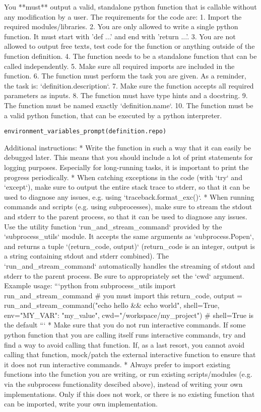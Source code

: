 \begin{tcolorbox}[title={\texttt{Coding Instructions}}]
You **must** output a valid, standalone python function that is callable without any modification by a user.
The requirements for the code are:
1. Import the required modules/libraries.
2. You are only allowed to write a single python function. It must start with 'def ...' and end with 'return ...'.
3. You are not allowed to output free texts, test code for the function or anything outside of the function definition.
4. The function needs to be a standalone function that can be called independently.
5. Make sure all required imports are included in the function.
6. The function must perform the task you are given. As a reminder, the task is: `{definition.description}`.
7. Make sure the function accepts all required parameters as inputs.
8. The function must have type hints and a docstring.
9. The function must be named exactly `{definition.name}`.
10. The function must be a valid python function, that can be executed by a python interpreter.

\texttt{{environment\_variables\_prompt(definition.repo)}}

Additional instructions:
* Write the function in such a way that it can easily be debugged later. This means that you should include a lot of print statements for logging purposes. Especially for long-running tasks, it is important to print the progress periodically.
* When catching exceptions in the code (with `try` and `except`), make sure to output the entire stack trace to stderr, so that it can be used to diagnose any issues, e.g. using `traceback.format\_exc()`.
* When running commands and scripts (e.g. using subprocesses), make sure to stream the stdout and stderr to the parent process, so that it can be used to diagnose any issues.
  Use the utility function `run\_and\_stream\_command` provided by the `subprocess\_utils` module. It accepts the same arguments as `subprocess.Popen`, and returns a tuple `(return\_code, output)` (return\_code is an integer, output is a string containing stdout and stderr combined).
  The `run\_and\_stream\_command` automatically handles the streaming of stdout and stderr to the parent process. Be sure to appropriately set the `cwd` argument.
  Example usage:
  ```python
  from subprocess\_utils import run\_and\_stream\_command  \# you must import this
  return\_code, output = run\_and\_stream\_command("echo hello \&\& echo world", shell=True, env={{"MY\_VAR": "my\_value"}}, cwd="/workspace/my\_project")  \# shell=True is the default
  ```
* Make sure that you do not run interactive commands. If some python function that you are calling itself runs interactive commands, try and find a way to avoid calling that function. If, as a last resort, you cannot avoid calling that function, mock/patch the external interactive function to ensure that it does not run interactive commands.
* Always prefer to import existing functions into the function you are writing, or run existing scripts/modules (e.g. via the subprocess functionality descibed above), instead of writing your own implementations. Only if this does not work, or there is no existing function that can be imported, write your own implementation.
\end{tcolorbox}
